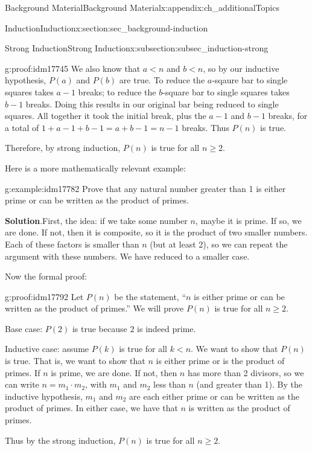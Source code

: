 \documentclass[oneside,10pt,]{book}
\numberwithin{equation}{chapter}
\newcommand{\lt}{<}
\begin{document}
\begin{appendixptx}{Background Material}{}{Background Material}{}{}{x:appendix:ch_additionalTopics}
\begin{sectionptx}{Induction}{}{Induction}{}{}{x:section:sec_background-induction}
\begin{subsectionptx}{Strong Induction}{}{Strong Induction}{}{}{x:subsection:subsec_induction-strong}
\begin{proofptx}{}{g:proof:idm17745}
We also know that \(a \lt n\) and \(b \lt n\), so by our inductive hypothesis, \(P(a)\) and \(P(b)\) are true.  To reduce the \(a\)-sqaure bar to single squares takes \(a-1\) breaks; to reduce the \(b\)-square bar to single squares takes \(b-1\) breaks.  Doing this results in our original bar being reduced to single squares.  All together it took the initial break, plus the \(a-1\) and \(b-1\) breaks, for a total of \(1+a-1+b-1 = a+b-1 = n-1\) breaks.  Thus \(P(n)\) is true.%
\par
Therefore, by strong induction, \(P(n)\) is true for all \(n \ge 2\).%
\end{proofptx}
Here is a more mathematically relevant example:%
\begin{example}{}{g:example:idm17782}%
Prove that any natural number greater than 1 is either prime or can be written as the product of primes.%
\par\smallskip%
\noindent\textbf{Solution}.\hypertarget{g:solution:idm17787}{}\quad{}First, the idea: if we take some number \(n\), maybe it is prime. If so, we are done. If not, then it is composite, so it is the product of two smaller numbers. Each of these factors is smaller than \(n\) (but at least 2), so we can repeat the argument with these numbers. We have reduced to a smaller case.%
\par
Now the formal proof:%
\begin{proofptx}{}{g:proof:idm17792}
Let \(P(n)\) be the statement, ``\(n\) is either prime or can be written as the product of primes.'' We will prove \(P(n)\) is true for all \(n \ge 2\).%
\par
Base case: \(P(2)\) is true because \(2\) is indeed prime.%
\par
Inductive case: assume \(P(k)\) is true for all \(k \lt  n\). We want to show that \(P(n)\) is true. That is, we want to show that \(n\) is either prime or is the product of primes. If \(n\) is prime, we are done. If not, then \(n\) has more than 2 divisors, so we can write \(n = m_1 \cdot m_2\), with \(m_1\) and \(m_2\) less than \(n\) (and greater than 1). By the inductive hypothesis, \(m_1\) and \(m_2\) are each either prime or can be written as the product of primes. In either case, we have that \(n\) is written as the product of primes.%
\par
Thus by the strong induction, \(P(n)\) is true for all \(n \ge 2\).%
\end{proofptx}
\end{example}

\end{subsectionptx}
\end{sectionptx}
\end{appendixptx}
\end{document}
